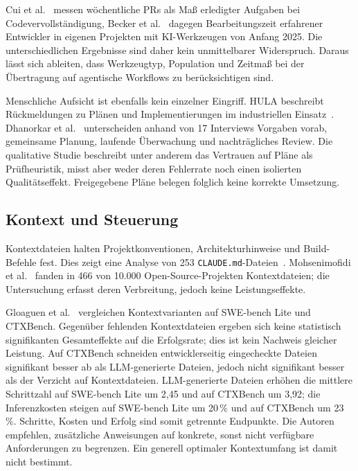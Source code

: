 \documentclass[conference]{IEEEtran}
\begin{document}
Cui et al.~\cite{cui2025genai} messen wöchentliche PRs als Maß erledigter Aufgaben bei Codevervollständigung, Becker et al.~\cite{becker2025metr} dagegen Bearbeitungszeit erfahrener Entwickler in eigenen Projekten mit KI-Werkzeugen von Anfang 2025. Die unterschiedlichen Ergebnisse sind daher kein unmittelbarer Widerspruch. Daraus lässt sich ableiten, dass Werkzeugtyp, Population und Zeitmaß bei der Übertragung auf agentische Workflows zu berücksichtigen sind.

Menschliche Aufsicht ist ebenfalls kein einzelner Eingriff. HULA beschreibt Rückmeldungen zu Plänen und Implementierungen im industriellen Einsatz~\cite{takerngsaksiri2025hula}. Dhanorkar et al.~\cite{dhanorkar2026oversight} unterscheiden anhand von 17 Interviews Vorgaben vorab, gemeinsame Planung, laufende Überwachung und nachträgliches Review. Die qualitative Studie beschreibt unter anderem das Vertrauen auf Pläne als Prüfheuristik, misst aber weder deren Fehlerrate noch einen isolierten Qualitätseffekt. Freigegebene Pläne belegen folglich keine korrekte Umsetzung.

\subsection{Kontext und Steuerung}
Kontextdateien halten Projektkonventionen, Architekturhinweise und Build-Befehle fest. Dies zeigt eine Analyse von 253 \texttt{CLAUDE.md}-Dateien~\cite{chatlatanagulchai2025manifests}. Mohsenimofidi et al.~\cite{mohsenimofidi2026context} fanden in 466 von 10.000 Open-Source-Projekten Kontextdateien; die Untersuchung erfasst deren Verbreitung, jedoch keine Leistungseffekte.

Gloaguen et al.~\cite{gloaguen2026agentsmd} vergleichen Kontextvarianten auf SWE-bench Lite und CTXBench. Gegenüber fehlenden Kontextdateien ergeben sich keine statistisch signifikanten Gesamteffekte auf die Erfolgsrate; dies ist kein Nachweis gleicher Leistung. Auf CTXBench schneiden entwicklerseitig eingecheckte Dateien signifikant besser ab als LLM-generierte Dateien, jedoch nicht signifikant besser als der Verzicht auf Kontextdateien. LLM-generierte Dateien erhöhen die mittlere Schrittzahl auf SWE-bench Lite um 2,45 und auf CTXBench um 3,92; die Inferenzkosten steigen auf SWE-bench Lite um 20\,\% und auf CTXBench um 23\,\%. Schritte, Kosten und Erfolg sind somit getrennte Endpunkte. Die Autoren empfehlen, zusätzliche Anweisungen auf konkrete, sonst nicht verfügbare Anforderungen zu begrenzen. Ein generell optimaler Kontextumfang ist damit nicht bestimmt.
\end{document}
